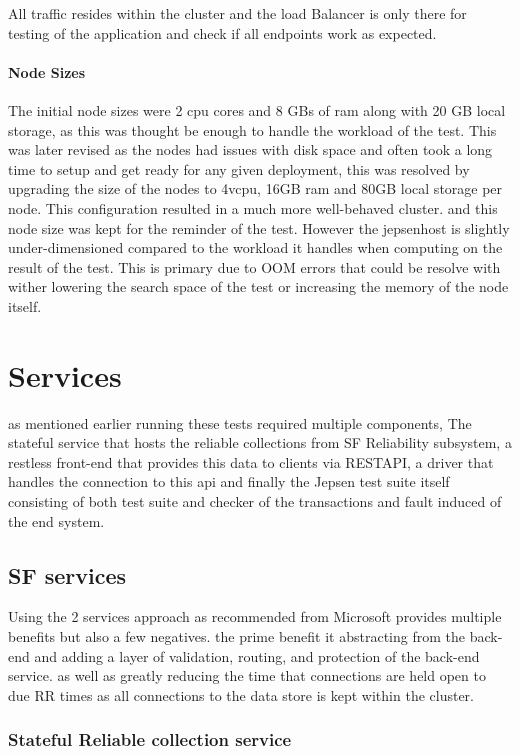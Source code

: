 \documentclass[a4paper,10pt,titlepage]{report}
\begin{document}
    All traffic resides within the cluster and the load Balancer is only there for testing of the application and check if all endpoints work as expected.

    \paragraph*{Node Sizes}

    The initial node sizes were 2 cpu cores and 8 GBs of ram along with 20 GB local storage, as this was thought be enough to handle the workload of the test. This was later revised as the nodes had issues with disk space and often took a long time to setup and get ready for any given deployment, this was resolved by upgrading the size of the nodes to 4vcpu, 16GB ram and 80GB local storage per node. This configuration resulted in a much more well-behaved cluster. and this node size was kept for the reminder of the test. However the jepsenhost is slightly under-dimensioned compared to the workload it handles when computing on the result of the test. This is primary due to OOM errors that could be resolve with wither lowering the search space of the test or increasing the memory of the node itself.


    \section{Services}
    as mentioned earlier running these tests required multiple components, The stateful service that hosts the reliable collections from SF Reliability subsystem, a restless front-end that provides this data to clients via RESTAPI, a driver that handles the connection to this api and finally the Jepsen test suite itself consisting of both test suite and checker of the transactions and fault induced of the end system.

    \subsection{SF services}
    Using the 2 services approach as recommended from Microsoft provides multiple benefits but also a few negatives. the prime benefit it abstracting from the back-end and adding a layer of validation, routing, and protection of the back-end service. as well as greatly reducing the time that connections are held open to due RR times as all connections to the data store is kept within the cluster. 
\subsubsection{Stateful Reliable collection service}
\end{document}
